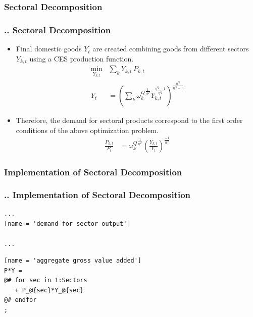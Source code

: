 \documentclass[11pt,aspectratio=169]{beamer}
\begin{document}
\subsubsection{Sectoral Decomposition}
\begin{frame}
\frametitle{{\thesection.\thesubsection.\thesubsubsection} Sectoral Decomposition}
\scriptsize
\begin{itemize}
\item Final domestic goods $Y_{t}$ are created combining goods from different sectors $Y_{k,t}$ using a CES production function.
\begin{align}
\underset{Y_{k,t}}{\mathrm{min}} & \sum_{k} Y_{k,t} \, P_{k,t} \\ 
Y_{t} &= \left(\sum_{k} {\omega^{Q}_{k}}^{\frac{1}{\eta^Q}} Y_{k,t}^{\frac{\eta^Q-1}{\eta^Q}} \right)^{\frac{\eta^Q}{\eta^Q-1}}
\end{align}

\item Therefore, the demand for sectoral products correspond to the first order conditions of the above optimization problem. 
\begin{align*}
\frac{P_{k,t}}{P_{t}} &= {\omega^{Q}_{k}}^{\frac{1}{\eta^Q}} \left(\frac{Y_{k,t}}{Y_{t}}\right)^{\frac{-1}{\eta^Q}}
\end{align*}
\end{itemize}
\end{frame}

\subsubsection{Implementation of Sectoral Decomposition}
\begin{frame}[fragile]
\frametitle{{\thesection.\thesubsection.\thesubsubsection} Implementation of Sectoral Decomposition}
\begin{lstlisting}[frame = single]
...
[name = 'demand for sector output']

...
\end{lstlisting}

\begin{lstlisting}[frame = single]
[name = 'aggregate gross value added']
P*Y = 
@# for sec in 1:Sectors
   + P_@{sec}*Y_@{sec}
@# endfor
;
\end{lstlisting}

\end{frame}
\end{document}
